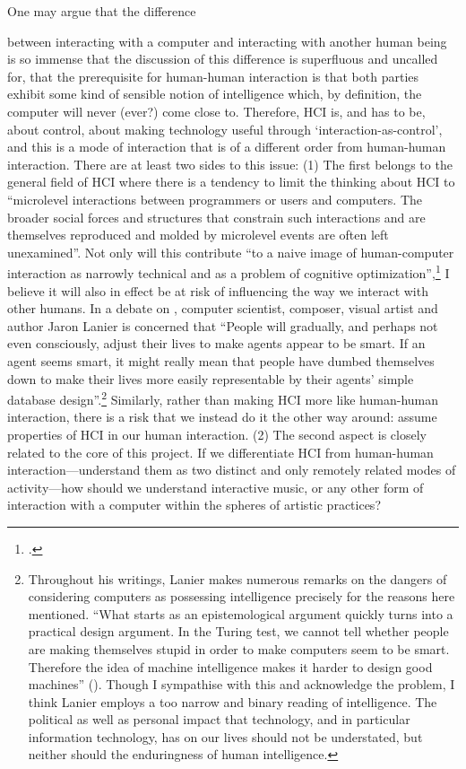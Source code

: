 \hypertarget{sec:inter-defin:par4}{One may argue that the difference} between interacting with a computer and interacting with another human being is so immense that the discussion of this difference is superfluous and uncalled for, that the prerequisite for human-human interaction is that both parties exhibit some kind of sensible notion of intelligence which, by definition, the computer will never (ever?) come close to. Therefore, HCI is, and has to be, about control, about making technology useful through `interaction-as-control', and this is a mode of interaction that is of a different order from human-human interaction. There are at least two sides to this issue: (1) The first belongs to the general field of HCI where there is a tendency to limit the thinking about HCI to ``microlevel interactions between programmers or users and computers. The broader social forces and structures that constrain such interactions and are themselves reproduced and molded by microlevel events are often left unexamined''. Not only will this contribute ``to a naive image of human-computer interaction as narrowly technical and as a problem of cognitive optimization'',\footcite[p. 325]{engestrom96} I believe it will also in effect be at risk of influencing the way we interact with other humans. In a debate on , computer scientist, composer, visual artist and author Jaron Lanier is concerned that
``People will gradually, and perhaps not even consciously, adjust their lives to make agents appear to be smart. If an agent seems smart, it might really mean that people have dumbed themselves down to make their lives more easily representable by their agents' simple database design''.\footnote{\cite[\textparagraph~3]{lanier96} Throughout his writings, Lanier makes numerous remarks on the dangers of considering computers as possessing intelligence precisely for the reasons here mentioned. ``What starts as an epistemological argument quickly turns into a practical design argument. In the Turing test, we cannot tell whether people are making themselves stupid in order to make computers seem to be smart. Therefore the idea of machine intelligence makes it harder to design good machines'' (\cite[\textparagraph~5]{lanier1000}). Though I sympathise with this and acknowledge the problem, I think Lanier employs a too narrow and binary reading of intelligence. The political as well as personal impact that technology, and in particular information technology, has on our lives should not be understated, but neither should the enduringness of human intelligence.} Similarly, rather than making HCI more like human-human interaction, there is a risk that we instead do it the other way around: assume properties of HCI in our human interaction. (2) The second aspect is closely related to the core of this project. If we differentiate HCI from human-human interaction---understand them as two distinct and only remotely related modes of activity---how should we understand interactive music, or any other form of interaction with a computer within the spheres of artistic practices? 


